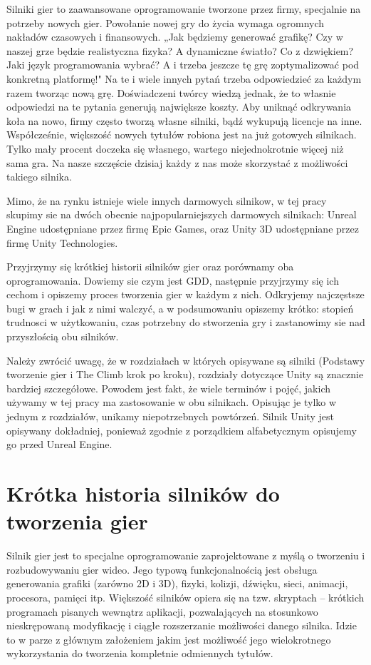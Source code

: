 \documentclass[brudnopis]{xmgr}
\begin{document}
Silniki gier to zaawansowane oprogramowanie tworzone przez firmy, specjalnie na potrzeby nowych gier. Powołanie nowej gry do życia wymaga ogromnych nakładów czasowych i finansowych. „Jak będziemy generować grafikę? Czy w naszej grze będzie realistyczna fizyka? A dynamiczne światło? Co z dzwiękiem? Jaki język programowania wybrać? A i trzeba jeszcze tę grę zoptymalizować pod konkretną platformę!" Na te i wiele innych pytań trzeba odpowiedzieć za każdym razem tworząc nową grę. Doświadczeni twórcy wiedzą jednak, że to własnie odpowiedzi na te pytania generują największe koszty. Aby uniknąć odkrywania koła na nowo, firmy często tworzą własne silniki, bądź wykupują licencje na inne. Współcześnie, większość nowych tytułów robiona jest na już gotowych silnikach. Tylko mały procent doczeka się własnego, wartego niejednokrotnie więcej niż sama gra. 
Na nasze szczęście dzisiaj każdy z nas może skorzystać z możliwości takiego silnika. 

Mimo, że na rynku istnieje wiele innych darmowych silnikow, w tej pracy skupimy sie na dwóch obecnie najpopularniejszych darmowych silnikach:
Unreal Engine udostępniane przez firmę Epic Games, oraz Unity 3D udostępniane przez firmę Unity Technologies. 

Przyjrzymy się krótkiej historii silników gier oraz porównamy oba oprogramowania. Dowiemy sie czym jest GDD, następnie przyjrzymy się ich cechom i opiszemy proces tworzenia gier w każdym z nich. Odkryjemy najczęstsze bugi w grach i jak z nimi walczyć, a w podsumowaniu opiszemy krótko: stopień trudnosci w użytkowaniu, czas potrzebny do stworzenia gry i zastanowimy sie nad przyszłością obu silników.

Należy zwrócić uwagę, że w rozdziałach w których opisywane są silniki (Podstawy tworzenie gier i The Climb krok po kroku), rozdziały dotyczące Unity są znacznie bardziej szczegółowe. Powodem jest fakt, że wiele terminów i pojęć, jakich używamy w tej pracy ma zastosowanie w obu silnikach. Opisując je tylko w jednym z rozdziałów, unikamy niepotrzebnych powtórzeń. Silnik Unity jest opisywany dokładniej, ponieważ zgodnie z porządkiem alfabetycznym opisujemy go przed Unreal Engine.

\chapter{Krótka historia silników do tworzenia gier}

Silnik gier jest to specjalne oprogramowanie zaprojektowane z myślą o tworzeniu i rozbudowywaniu gier wideo. Jego typową funkcjonalnością jest obsługa generowania grafiki (zarówno 2D i 3D), fizyki, kolizji, dźwięku, sieci, animacji, procesora, pamięci itp. Większość silników opiera się na tzw. skryptach – krótkich programach pisanych wewnątrz aplikacji, pozwalających na stosunkowo nieskrępowaną modyfikację i ciągłe rozszerzanie możliwości danego silnika. Idzie to w parze z głównym założeniem jakim jest możliwość jego wielokrotnego wykorzystania do tworzenia kompletnie odmiennych tytułów.  
\end{document}
